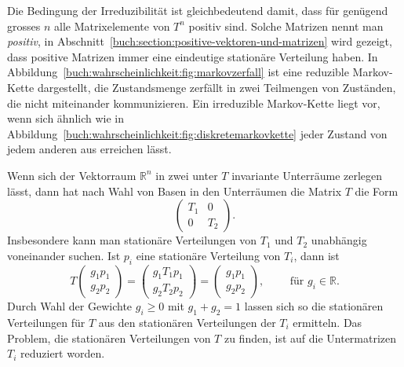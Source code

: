 Die Bedingung der Irreduzibilität ist gleichbedeutend damit,
dass für genügend grosses $n$ alle Matrixelemente von $T^n$ positiv sind.
Solche Matrizen nennt man {\em positiv}, 
%
in Abschnitt~\ref{buch:section:positive-vektoren-und-matrizen}
wird gezeigt, dass positive Matrizen immer eine eindeutige
stationäre Verteilung haben.
In Abbildung~\ref{buch:wahrscheinlichkeit:fig:markovzerfall}
ist eine reduzible Markov-Kette dargestellt, die Zustandsmenge
%
zerfällt in zwei Teilmengen von Zuständen, die nicht miteinander
kommunizieren.
Ein irreduzible Markov-Kette liegt vor, wenn sich ähnlich wie
in Abbildung~\ref{buch:wahrscheinlichkeit:fig:diskretemarkovkette}
jeder Zustand von jedem anderen aus erreichen lässt.

Wenn sich der Vektorraum $\mathbb{R}^n$ in zwei unter $T$ invariante
Unterräume zerlegen lässt, dann hat nach Wahl von Basen in den Unterräumen
die Matrix $T$ die Form
\[
\left(
\begin{array}{c|c}
T_1&0\\
\hline
0&T_2
\end{array}
\right).
\]
Insbesondere kann man stationäre Verteilungen von $T_1$ und $T_2$ 
unabhängig voneinander suchen.
Ist $p_i$ eine stationäre Verteilung von $T_i$, dann ist
\[
T
\left(
\begin{array}{c}
g_1p_1\\
\hline g_2p_2
\end{array}
\right)
=
\left(
\begin{array}{c}
g_1T_1p_1\\
\hline
g_2T_2p_2
\end{array}
\right)
=
\left(
\begin{array}{c}
g_1p_1\\
\hline
g_2p_2
\end{array}
\right),\qquad
\text{ für $g_i\in\mathbb{R}$.}
\]
Durch Wahl der Gewichte $g_i\ge 0$ mit $g_1+g_2=1$ lassen sich so
die stationären Verteilungen für $T$ aus den stationären Verteilungen
der $T_i$ ermitteln.
Das Problem, die stationären Verteilungen von $T$ zu finden, ist
auf die Untermatrizen $T_i$ reduziert worden.

